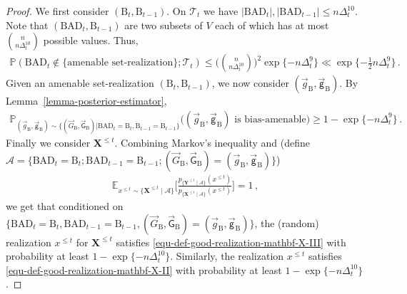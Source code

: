 \documentclass[11pt]{article}
\numberwithin{equation}{section}
\begin{document}
\begin{proof}
We first consider $(\mathrm{B}_t, \mathrm{B}_{t-1})$. On $\mathcal{T}_{t}$ we have $|\mathrm{BAD}_t|, |\mathrm{BAD}_{t-1}|  \leq n \Delta_t^{10} $. Note that $(\mathrm{BAD}_t, \mathrm{B}_{t-1})$ are two subsets of $V$ each of which has at most $\binom{n}{n \Delta_t^{10} }$ possible values. Thus,
\begin{align*}
    \mathbb P(\mathrm{BAD}_t \not\in \{\mbox{amenable set-realization}\}; \mathcal T_t ) \leq \Big(\binom{n}{n \Delta_t^{10} }\Big)^2 \exp \{ - n \Delta_t^9 \} \ll \exp \{ - \tfrac{1}{2} n \Delta_t^{9} \} \,.
\end{align*}
Given an amenable set-realization $(\mathrm{B}_t, \mathrm{B}_{t-1})$, we  now consider $(\overrightarrow{g}_{\mathrm{B}}, \overrightarrow{\mathsf{g}}_{\mathrm{B}})$. By Lemma~\ref{lemma-posterior-estimator},
\begin{align*}
    \mathbb{P}_{ (\overrightarrow{g}_{\mathrm{B}}, \overrightarrow{\mathsf{g}}_{\mathrm{B}}) \sim \{ (\overrightarrow{G}_{\mathrm{B}}, \overrightarrow{\mathsf{G}}_{\mathrm{B}}) | \mathrm{BAD}_t = \mathrm{B}_t, \mathrm{B}_{t-1} = \mathrm{B}_{t-1} \} } \big(   (\overrightarrow{g}_{\mathrm{B}}, \overrightarrow{\mathsf{g}}_{\mathrm{B}}) \mbox{ is bias-amenable} \big) \geq 1 - \exp \{ - n \Delta_t^{9} \}  \,.
\end{align*}
Finally we consider $\mathbf{X}^{\leq t}$. Combining Markov's inequality and (define $\mathcal{A} = \{ \mathrm{BAD}_t = \mathrm{B}_t ; \mathrm{BAD}_{t-1} = \mathrm{B}_{t-1}; (\overrightarrow{G}_{\mathrm{B}}, \overrightarrow{\mathsf{G}}_{\mathrm{B}}) = (\overrightarrow{g}_{\mathrm{B}}, \overrightarrow{\mathsf{g}}_{\mathrm{B}}) \}$)
\begin{align*}
    \mathbb{E}_{ x^{\leq t} \sim \{ \mathbf{X}^{\leq t} \mid \mathcal{A} \} } \Big[ \frac{ p_{ \{ \mathbf{Y}^{\leq t} \mid \mathcal{A} \} } ( x^{\leq t} ) }{ p_{ \{ \mathbf{X}^{\leq t} \mid \mathcal{A} \} } ( x^{\leq t} ) } \Big] = 1 \,,
\end{align*}
we get that conditioned on $\{ \mathrm{BAD}_t = \mathrm{B}_t, \mathrm{BAD}_{t-1} = \mathrm{B}_{t-1}, (\overrightarrow{G}_{\mathrm{B}}, \overrightarrow{\mathsf{G}}_{\mathrm{B}}) = (\overrightarrow{g}_{\mathrm{B}}, \overrightarrow{\mathsf{g}}_{\mathrm{B}}) \}$, the (random) realization $x^{\leq t}$ for $\mathbf{X}^{\leq t}$ satisfies \eqref{equ-def-good-realization-mathbf-X-III} with probability at least $1 - \exp \{ - n \Delta_t^{10} \}$. Similarly, the realization $x^{\leq t}$ satisfies \eqref{equ-def-good-realization-mathbf-X-II} with probability at least $1 - \exp \{ - n \Delta_t^{10} \}$.

\end{proof}
\end{document}
